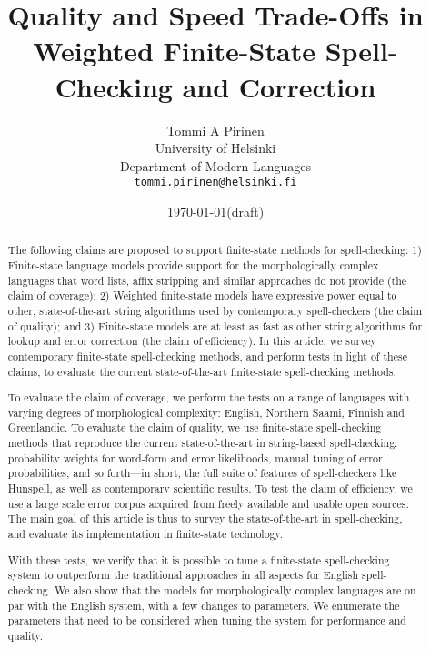 \documentclass[a4paper,12pt]{article}
\title{Quality and Speed Trade-Offs in
    Weighted Finite-State Spell-Checking and Correction}
\author{Tommi A Pirinen\\
 [0.5cm] University of Helsinki\\ %
 Department of Modern Languages\\ %
 \texttt{tommi.pirinen@helsinki.fi}} %
\date{\today (draft)}
\begin{document}
\maketitle
\thispagestyle{empty}

\begin{abstract} \noindent The following claims are proposed to support
    finite-state methods for spell-checking: 1) Finite-state language models
    provide support for the morphologically complex languages that word lists,
    affix stripping and similar approaches do not provide (the claim of coverage);
    2) Weighted finite-state models have expressive power equal to other,
    state-of-the-art string algorithms used by contemporary spell-checkers (the
    claim of quality); and 3) Finite-state models are at least as fast as other
    string algorithms for lookup and error correction (the claim of
    efficiency). In this article,  we survey contemporary finite-state
    spell-checking methods, and perform tests in light of these claims, to
    evaluate the current state-of-the-art finite-state spell-checking methods.

    To evaluate the claim of coverage, we perform the tests on a range of languages
    with varying degrees of morphological complexity: English, Northern Saami, Finnish and
    Greenlandic. To evaluate the claim of quality, we use finite-state
    spell-checking methods that reproduce the current state-of-the-art in
    string-based spell-checking: probability weights for word-form and error
    likelihoods, manual tuning of error probabilities, and so forth---in short,
    the full suite of features of spell-checkers like Hunspell, as well as 
    contemporary scientific results. To test the claim of efficiency, we use a
    large scale error corpus acquired from freely available and usable open
    sources. The main goal of this article is thus to survey the
    state-of-the-art in spell-checking, and evaluate its implementation in
    finite-state technology.

    With these tests, we verify that it is possible to tune a finite-state
    spell-checking system to outperform the traditional approaches in all aspects
    for English spell-checking. We also show that the models for
    morphologically complex languages are on par with the English system, with a
    few changes to parameters. We enumerate the parameters that need to
    be considered when tuning the system for performance and quality.

\end{abstract}
\end{document}
